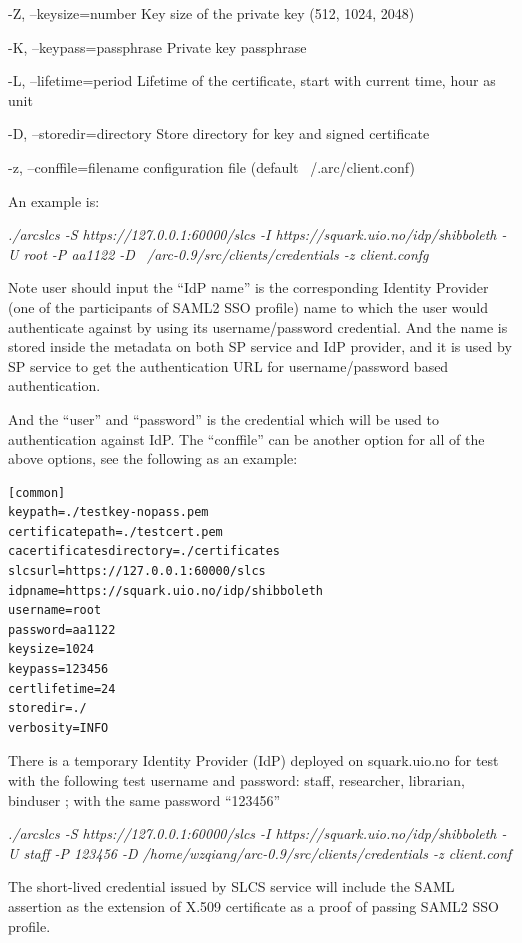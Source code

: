 \documentclass{article}                            %
\begin{document}
  -Z, --keysize=number         Key size of the private key (512, 1024, 2048)

  -K, --keypass=passphrase     Private key passphrase

  -L, --lifetime=period        Lifetime of the certificate, start with current time, hour as unit

  -D, --storedir=directory     Store directory for key and signed certificate

  -z, --conffile=filename      configuration file (default ~/.arc/client.conf)

An example is:

\textit{./arcslcs -S https://127.0.0.1:60000/slcs -I https://squark.uio.no/idp/shibboleth -U root -P aa1122 -D   ~/arc-0.9/src/clients/credentials -z client.confg}

    Note user should input the ``IdP name'' is the corresponding Identity Provider (one of the participants of SAML2 SSO profile) name to which the user would authenticate against by using its username/password credential. And the name is stored inside the metadata on both SP service and IdP provider, and it is used by SP service to get the authentication URL for username/password based authentication.

    And the ``user'' and ``password'' is the credential which will be used to authentication against IdP.
The ``conffile'' can be another option for all of the above options, see the following as an example:

\begin{verbatim}
[common]
keypath=./testkey-nopass.pem
certificatepath=./testcert.pem
cacertificatesdirectory=./certificates
slcsurl=https://127.0.0.1:60000/slcs
idpname=https://squark.uio.no/idp/shibboleth
username=root
password=aa1122
keysize=1024
keypass=123456
certlifetime=24
storedir=./
verbosity=INFO
\end{verbatim}

    There is a temporary Identity Provider (IdP) deployed on squark.uio.no for test with the following test username and password: staff, researcher, librarian, binduser ; with the same password ``123456''

\textit{./arcslcs -S https://127.0.0.1:60000/slcs -I https://squark.uio.no/idp/shibboleth -U staff -P 123456 -D /home/wzqiang/arc-0.9/src/clients/credentials -z client.conf}

    The short-lived credential issued by SLCS service will include the SAML assertion as the extension of X.509 certificate as a proof of passing SAML2 SSO profile.
\end{document}
